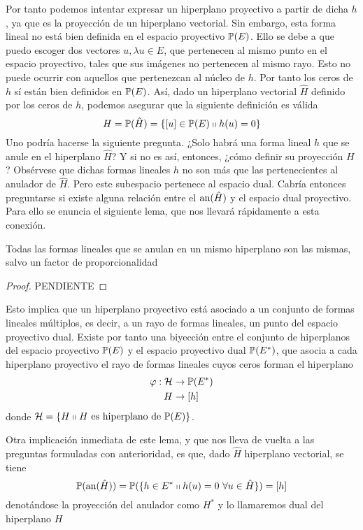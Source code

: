 Por tanto podemos intentar expresar un hiperplano proyectivo a partir de dicha $h$, ya que es la proyección de un hiperplano vectorial. Sin embargo, esta forma lineal no está bien definida en el espacio proyectivo $\mathbb{P}(E)$. Ello se debe a que puedo escoger dos vectores  $u, \lambda u\in E$, que pertenecen al mismo punto en el espacio proyectivo, tales que sus imágenes no pertenecen al mismo rayo. Esto no puede ocurrir con aquellos que pertenezcan al núcleo de $h$. Por tanto los ceros de $h$ sí están bien definidos en $\mathbb{P}(E)$. Así, dado un hiperplano vectorial $\hat{H}$ definido por los ceros de $h$, podemos asegurar que la siguiente definición es válida
\begin{equation}
H=\mathbb{P}(\hat{H})=\{[u]\in\mathbb{P}(E)\shortparallel h(u)=0\}
\end{equation}
Uno podría hacerse la siguiente pregunta. ¿Solo habrá una forma lineal $h$ que se anule en el hiperplano $\hat{H}$? Y si no es así, entonces, ¿cómo definir su proyección $H$? Obsérvese que dichas formas lineales $h$ no son más que las pertenecientes al anulador de $\hat{H}$. Pero este subespacio pertenece al espacio dual. Cabría entonces preguntarse si existe alguna relación entre el $\text{an}(\hat{H})$ y el espacio dual proyectivo. Para ello se enuncia el siguiente lema, que nos llevará rápidamente a esta conexión.
\begin{lem}
	\label{C1_lem_multiplosformaslienales}
	Todas las formas lineales que se anulan en un mismo hiperplano son las mismas, salvo un factor de proporcionalidad
\end{lem}
\begin{proof}
	PENDIENTE
\end{proof}
Esto implica que un hiperplano proyectivo está asociado a un conjunto de formas lineales múltiplos, es decir, a un rayo de formas lineales, un punto del espacio proyectivo dual. Existe por tanto una biyección entre el conjunto de hiperplanos del espacio proyectivo $\mathbb{P}(E)$ y el espacio proyectivo dual $\mathbb{P}(E^*)$, que asocia a cada hiperplano proyectivo el rayo de formas lineales cuyos ceros forman el hiperplano
\begin{equation}
\begin{split}
\varphi:\mathcal{H}& \rightarrow \mathbb{P}(E^*)\\
H &\rightarrow [h]
\end{split}
\end{equation}
donde $\mathcal{H}=\{H\shortparallel H \text{ es hiperplano de } \mathbb{P}(E)\}$.

Otra implicación inmediata de este lema, y que nos lleva de vuelta a las preguntas formuladas con anterioridad, es que, dado $\hat{H}$ hiperplano vectorial, se tiene
\begin{equation}
\proy(\an{\hat{H}})=\proy(\{h\in E^*\tq h(u)=0\ \forall u\in \hat{H}\})=[h]
\end{equation}
denotándose la proyección del anulador como $H^*$ y lo llamaremos dual del hiperplano $H$

